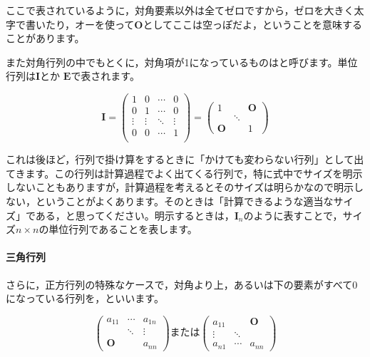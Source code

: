 \documentclass{ltjsbook}
\begin{document}
ここで表されているように，対角要素以外は全てゼロですから，ゼロを大きく太字で書いたり，オーを使って$\bm{O}$としてここは空っぽだよ，ということを意味することがあります。

また対角行列の中でもとくに，対角項が1になっているものはと呼びます。単位行列は$\bm{I}$とか
$\bm{E}$で表されます。


\begin{equation*}
	\bm{I} =
	\begin{pmatrix}
		1      & 0      & \cdots & 0      \\
		0      & 1      & \cdots & 0      \\
		\vdots & \vdots & \ddots & \vdots \\
		0      & 0      & \cdots & 1      \\
	\end{pmatrix} =
	\begin{pmatrix}
		1      &        & \bm{O} \\
		       & \ddots          \\
		\bm{O} &        & 1
	\end{pmatrix}
\end{equation*}


これは後ほど，行列で掛け算をするときに「かけても変わらない行列」として出てきます。この行列は計算過程でよく出てくる行列で，特に式中でサイズを明示しないこともありますが，計算過程を考えるとそのサイズは明らかなので明示しない，ということがよくあります。そのときは「計算できるような適当なサイズ」である，と思ってください。明示するときは，$\bm{I}_n$のように表すことで，サイズ$n \times n$の単位行列であることを表します。

\paragraph{三角行列}
さらに，正方行列の特殊なケースで，対角より上，あるいは下の要素がすべて$0$になっている行列を，といいます。

\begin{equation*}
	\begin{pmatrix}
		a_{11} & \cdots & a_{1n} \\
		       & \ddots & \vdots \\
		\bm{O} &        & a_{nn}
	\end{pmatrix}\text{または}
	\begin{pmatrix}
		a_{11} &        & \bm{O} \\
		\vdots & \ddots &        \\
		a_{n1} & \cdots & a_{nn}
	\end{pmatrix}
\end{equation*}
\end{document}
